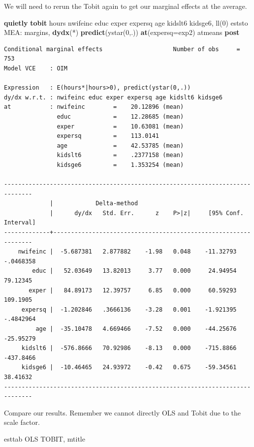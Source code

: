 \documentclass[
]{book}
\newenvironment{Shaded}{\begin{snugshade}}{\end{snugshade}}
\newcommand{\FunctionTok}[1]{\textcolor[rgb]{0.13,0.29,0.53}{\textbf{#1}}}
\newcommand{\KeywordTok}[1]{\textcolor[rgb]{0.13,0.29,0.53}{\textbf{#1}}}
\newcommand{\NormalTok}[1]{#1}
\newcommand{\OtherTok}[1]{\textcolor[rgb]{0.56,0.35,0.01}{#1}}
\begin{document}
We will need to rerun the Tobit again to get our marginal effects at the average.

\begin{Shaded}
\begin{Highlighting}[]
\KeywordTok{quietly} \KeywordTok{tobit}\NormalTok{ hours nwifeinc educ exper expersq age kidslt6 kidsge6, ll(0)}
\NormalTok{eststo MEA: margins, }\KeywordTok{dydx}\NormalTok{(*) }\KeywordTok{predict}\NormalTok{(ystar(0,.)) }\FunctionTok{at}\NormalTok{(expersq=}\OtherTok{\textasciigrave{}exp2\textquotesingle{}}\NormalTok{) atmeans }\KeywordTok{post}
\end{Highlighting}
\end{Shaded}

\begin{verbatim}
Conditional marginal effects                    Number of obs     =        753
Model VCE    : OIM

Expression   : E(hours*|hours>0), predict(ystar(0,.))
dy/dx w.r.t. : nwifeinc educ exper expersq age kidslt6 kidsge6
at           : nwifeinc        =    20.12896 (mean)
               educ            =    12.28685 (mean)
               exper           =    10.63081 (mean)
               expersq         =    113.0141
               age             =    42.53785 (mean)
               kidslt6         =    .2377158 (mean)
               kidsge6         =    1.353254 (mean)

------------------------------------------------------------------------------
             |            Delta-method
             |      dy/dx   Std. Err.      z    P>|z|     [95% Conf. Interval]
-------------+----------------------------------------------------------------
    nwifeinc |  -5.687381   2.877882    -1.98   0.048    -11.32793   -.0468358
        educ |   52.03649   13.82013     3.77   0.000     24.94954    79.12345
       exper |   84.89173   12.39757     6.85   0.000     60.59293    109.1905
     expersq |  -1.202846   .3666136    -3.28   0.001    -1.921395   -.4842964
         age |  -35.10478   4.669466    -7.52   0.000    -44.25676   -25.95279
     kidslt6 |  -576.8666   70.92986    -8.13   0.000    -715.8866   -437.8466
     kidsge6 |  -10.46465   24.93972    -0.42   0.675    -59.34561    38.41632
------------------------------------------------------------------------------
\end{verbatim}

Compare our results. Remember we cannot directly OLS and Tobit due to the scale factor.

\begin{Shaded}
\begin{Highlighting}[]
\NormalTok{esttab OLS TOBIT, mtitle}
\end{Highlighting}
\end{Shaded}
\end{document}
